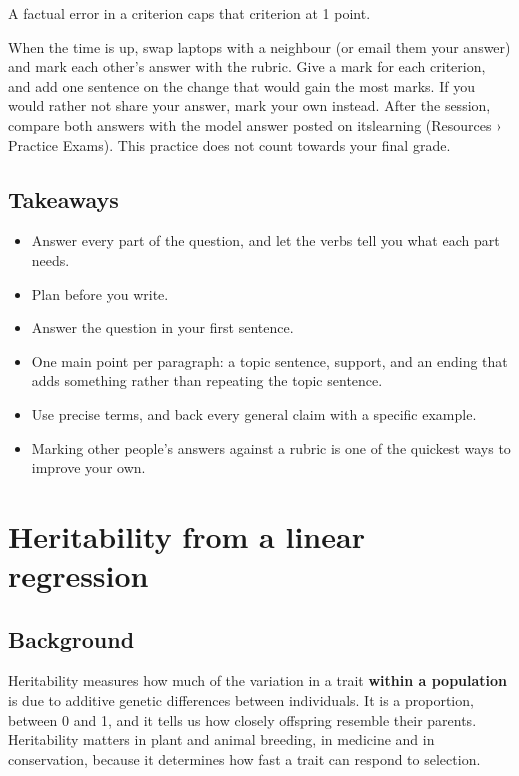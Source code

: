 \documentclass[
  a4paper]{book}
\providecommand{\tightlist}{%
  \setlength{\itemsep}{0pt}\setlength{\parskip}{0pt}}
\begin{document}
A factual error in a criterion caps that criterion at 1 point.

When the time is up, swap laptops with a neighbour (or email them your answer) and mark each other's answer with the rubric. Give a mark for each criterion, and add one sentence on the change that would gain the most marks. If you would rather not share your answer, mark your own instead. After the session, compare both answers with the model answer posted on itslearning (Resources › Practice Exams). This practice does not count towards your final grade.

\section{Takeaways}\label{takeaways-17}

\begin{itemize}
\tightlist
\item
  Answer every part of the question, and let the verbs tell you what each part needs.
\item
  Plan before you write.
\item
  Answer the question in your first sentence.
\item
  One main point per paragraph: a topic sentence, support, and an ending that adds something rather than repeating the topic sentence.
\item
  Use precise terms, and back every general claim with a specific example.
\item
  Marking other people's answers against a rubric is one of the quickest ways to improve your own.
\end{itemize}

\chapter{Heritability from a linear regression}\label{heritability-from-a-linear-regression}

\section{Background}\label{background-16}

Heritability measures how much of the variation in a trait \textbf{within a population} is due to additive genetic differences between individuals. It is a proportion, between 0 and 1, and it tells us how closely offspring resemble their parents. Heritability matters in plant and animal breeding, in medicine and in conservation, because it determines how fast a trait can respond to selection.
\end{document}
